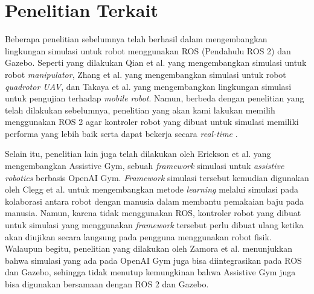 \section{Penelitian Terkait}
\label{sec:penelitianterkait}

Beberapa penelitian sebelumnya telah berhasil dalam mengembangkan lingkungan simulasi untuk robot menggunakan ROS (Pendahulu ROS 2) dan Gazebo.
Seperti yang dilakukan Qian et al. \citep{qian2014} yang mengembangkan simulasi untuk robot \emph{manipulator}, Zhang et al. \citep{zhang2015} yang mengembangkan simulasi untuk robot \emph{quadrotor UAV}, dan Takaya et al. \citep{takaya2016} yang mengembangkan lingkungan simulasi untuk pengujian terhadap \emph{mobile robot}.
Namun, berbeda dengan penelitian yang telah dilakukan sebelumnya, penelitian yang akan kami lakukan memilih menggunakan ROS 2 agar kontroler robot yang dibuat untuk simulasi memiliki performa yang lebih baik serta dapat bekerja secara \emph{real-time} \citep{maruyama2016}.

Selain itu, penelitian lain juga telah dilakukan oleh Erickson et al. \citep{erickson2020} yang mengembangkan Assistive Gym, sebuah \emph{framework} simulasi untuk \emph{assistive robotics} berbasis OpenAI Gym.
\emph{Framework} simulasi tersebut kemudian digunakan oleh Clegg et al. \citep{clegg2020} untuk mengembangkan metode \emph{learning} melalui simulasi pada kolaborasi antara robot dengan manusia dalam membantu pemakaian baju pada manusia.
Namun, karena tidak menggunakan ROS, kontroler robot yang dibuat untuk simulasi yang menggunakan \emph{framework} tersebut perlu dibuat ulang ketika akan diujikan secara langsung pada pengguna menggunakan robot fisik.
Walaupun begitu, penelitian yang dilakukan oleh Zamora et al. \citep{zamora2016} menunjukkan bahwa simulasi yang ada pada OpenAI Gym juga bisa diintegrasikan pada ROS dan Gazebo, sehingga tidak menutup kemungkinan bahwa Assistive Gym juga bisa digunakan bersamaan dengan ROS 2 dan Gazebo.
